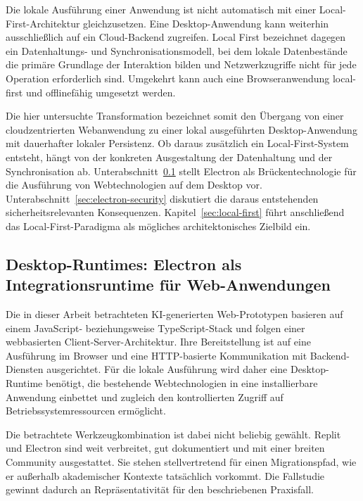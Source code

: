 Die lokale Ausführung einer Anwendung ist nicht automatisch mit einer Local-First-Architektur gleichzusetzen.
Eine Desktop-Anwendung kann weiterhin ausschließlich auf ein Cloud-Backend zugreifen.
Local First bezeichnet dagegen ein Datenhaltungs- und Synchronisationsmodell, bei dem lokale Datenbestände die primäre Grundlage der Interaktion bilden und Netzwerkzugriffe nicht für jede Operation erforderlich sind.
Umgekehrt kann auch eine Browseranwendung local-first und offlinefähig umgesetzt werden.

Die hier untersuchte Transformation bezeichnet somit den Übergang von einer cloudzentrierten Webanwendung zu einer lokal ausgeführten Desktop-Anwendung mit dauerhafter lokaler Persistenz.
Ob daraus zusätzlich ein Local-First-System entsteht, hängt von der konkreten Ausgestaltung der Datenhaltung und der Synchronisation ab.
Unterabschnitt~\ref{sec:desktop-runtimes} stellt Electron als Brückentechnologie für die Ausführung von Webtechnologien auf dem Desktop vor.
Unterabschnitt~\ref{sec:electron-security} diskutiert die daraus entstehenden sicherheitsrelevanten Konsequenzen.
Kapitel~\ref{sec:local-first} führt anschließend das Local-First-Paradigma als mögliches architektonisches Zielbild ein.
\subsection{Desktop-Runtimes: Electron als Integrationsruntime für Web-Anwendungen}
\label{sec:desktop-runtimes}
Die in dieser Arbeit betrachteten KI-generierten Web-Prototypen basieren auf einem JavaScript- beziehungsweise TypeScript-Stack und folgen einer webbasierten Client-Server-Architektur.
Ihre Bereitstellung ist auf eine Ausführung im Browser und eine HTTP-basierte Kommunikation mit Backend-Diensten ausgerichtet.
Für die lokale Ausführung wird daher eine Desktop-Runtime benötigt, die bestehende Webtechnologien in eine installierbare Anwendung einbettet und zugleich den kontrollierten Zugriff auf Betriebssystemressourcen ermöglicht.

Die betrachtete Werkzeugkombination ist dabei nicht beliebig gewählt.
Replit und Electron sind weit verbreitet, gut dokumentiert und mit einer breiten Community ausgestattet.
Sie stehen stellvertretend für einen Migrationspfad, wie er außerhalb akademischer Kontexte tatsächlich vorkommt.
Die Fallstudie gewinnt dadurch an Repräsentativität für den beschriebenen Praxisfall.

